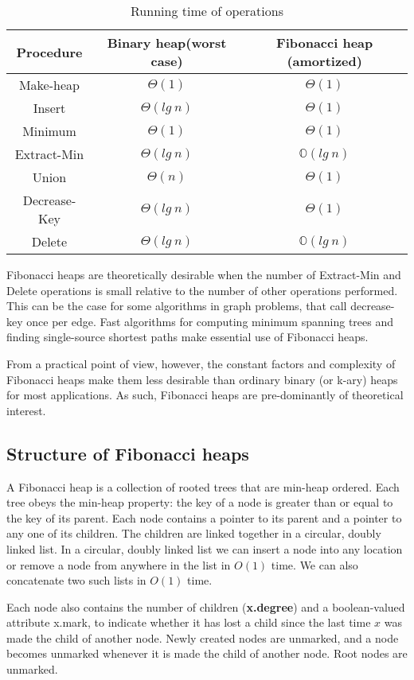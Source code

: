 \begin{table}[h!]
\caption{Running time of operations}
\begin{tabular}{ccc}
	Procedure & Binary heap(worst case) & Fibonacci heap (amortized) \\ \hline
	Make-heap & $\Theta(1)$ & $\Theta(1)$ \\
	Insert    & $\Theta(lg\ n)$ & $\Theta(1)$ \\
	Minimum   & $\Theta(1)$ & $\Theta(1)$ \\
	Extract-Min & $\Theta(lg\ n)$ & $\mathbb{O}(lg\ n)$ \\
	Union	& $\Theta(n)$ & $\Theta(1)$ \\
	Decrease-Key & $\Theta(lg\ n)$ & $\Theta(1)$ \\
	Delete & $\Theta(lg\ n)$ & $\mathbb{O}(lg\ n)$
\end{tabular}
\end{table}

Fibonacci heaps are theoretically desirable when the number
of Extract-Min and Delete operations is small relative to the
number of other operations performed. This can be the case for
some algorithms in graph problems, that call decrease-key once
per edge. Fast algorithms for computing minimum spanning trees and
finding single-source shortest paths make essential use of
Fibonacci heaps.

From a practical point of view, however, the constant factors
and complexity of Fibonacci heaps make them less desirable than
ordinary binary (or k-ary) heaps for most applications.
As such, Fibonacci heaps are pre-dominantly of theoretical
interest.

\subsection{Structure of Fibonacci heaps}
A Fibonacci heap is a collection of rooted trees that are
min-heap ordered. Each tree obeys the min-heap property: the
key of a node is greater than or equal to the key of its
parent. Each node contains a pointer to its parent and a pointer
to any one of its children. The children are linked together in
a circular, doubly linked list. In a circular, doubly linked list
we can insert a node into any location or remove a node from
anywhere in the list in $O(1)$ time. We can also concatenate two
such lists in $O(1)$ time. 

Each node also contains the number of children (\textbf{x.degree}) and
a boolean-valued attribute x.mark, to indicate whether it has
lost a child since the last time $x$ was made the child of another
node. Newly created nodes are unmarked, and a node becomes unmarked
whenever it is made the child of another node. Root nodes are unmarked.

